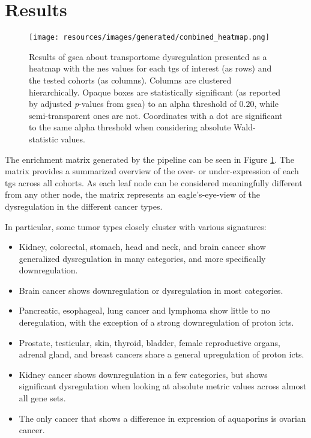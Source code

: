 \section{Results}

\begin{figure}
    \centering
    \texttt{[image: resources/images/generated/combined\_heatmap.png]}
    \caption{\small Results of \gls{gsea} about transportome dysregulation presented as a heatmap with the \gls{nes} values for each \gls{tgs} of interest (as rows) and the tested cohorts (as columns). Columns are clustered hierarchically. Opaque boxes are statistically significant (as reported by adjusted \textit{p}-values from \gls{gsea}) to an alpha threshold of $0.20$, while semi-transparent ones are not. Coordinates with a dot are significant to the same alpha threshold when considering absolute Wald-statistic values.}
    \label{fig:full_enrichment_heatmap}
\end{figure}

The enrichment matrix generated by the pipeline can be seen in Figure \ref{fig:full_enrichment_heatmap}.
The matrix provides a summarized overview of the over- or under-expression of each \gls{tgs} across all cohorts.
As each leaf node can be considered meaningfully different from any other node, the matrix represents an eagle's-eye-view of the dysregulation in the different cancer types.

In particular, some tumor types closely cluster with various signatures:
\begin{itemize}
    \item Kidney, colorectal, stomach, head and neck, and brain cancer show generalized dysregulation in many categories, and more specifically downregulation.
    \item Brain cancer shows downregulation or dysregulation in most categories.
    \item Pancreatic, esophageal, lung cancer and lymphoma show little to no deregulation, with the exception of a strong downregulation of proton \glspl{ict}.
    \item Prostate, testicular, skin, thyroid, bladder, female reproductive organs, adrenal gland, and breast cancers share a general upregulation of proton \glspl{ict}.
    \item Kidney cancer shows downregulation in a few categories, but shows significant dysregulation when looking at absolute metric values across almost all gene sets.
    \item The only cancer that shows a difference in expression of aquaporins is ovarian cancer.
\end{itemize}

